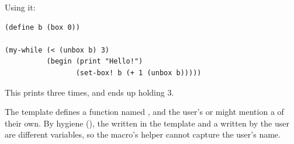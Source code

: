 Using it:
\begin{lstlisting}
(define b (box 0))

(my-while (< (unbox b) 3)
          (begin (print "Hello!")
                 (set-box! b (+ 1 (unbox b)))))
\end{lstlisting}
This prints  three times, and  ends up holding 3.

\begin{remark}
The template defines a function named , and the user's  or  might mention a  of their own. By hygiene (), the  written in the template and a  written by the user are different variables, so the macro's helper cannot capture the user's name.
\end{remark}
